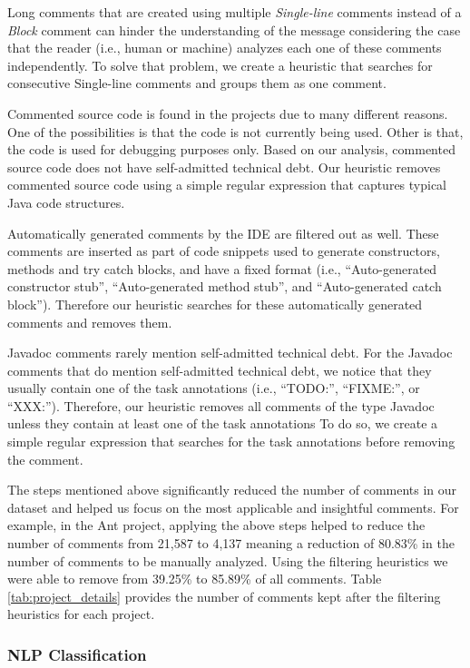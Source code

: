 Long comments that are created using multiple \emph{Single-line} comments instead of a \emph{Block} comment can hinder the understanding of the message considering the case that the reader (i.e., human or machine) analyzes each one of these comments independently. To solve that problem, we create a heuristic that searches for consecutive Single-line comments and groups them as one comment.
 
Commented source code is found in the projects due to many different reasons. One of the possibilities is that the code is not currently being used. Other is that, the code is used for debugging purposes only. Based on our analysis, commented source code does not have self-admitted technical debt. Our heuristic removes commented source code using a simple regular expression that captures typical Java code structures.

Automatically generated comments by the IDE are filtered out as well. These comments are inserted as part of code snippets used to generate constructors, methods and try catch blocks, and have a fixed format (i.e., ``Auto-generated constructor stub'', ``Auto-generated method stub'', and ``Auto-generated catch block''). Therefore our heuristic searches for these automatically generated comments and removes them. 

Javadoc comments rarely mention self-admitted technical debt. For the Javadoc comments that do mention self-admitted technical debt, we notice that they usually contain one of the task annotations (i.e., ``TODO:'', ``FIXME:'', or ``XXX:''). Therefore, our heuristic removes all comments of the type Javadoc unless they contain at least one of the task annotations  To do so, we create a simple regular expression that searches for the task annotations before removing the comment.  

The steps mentioned above significantly reduced the number of comments in our dataset and helped us focus on the most applicable and insightful comments. For example, in the Ant project, applying the above steps helped to reduce the number of comments from 21,587 to 4,137 meaning a reduction of 80.83\% in the number of comments to be manually analyzed. Using the filtering heuristics we were able to remove from 39.25\% to 85.89\% of all comments. Table \ref{tab:project_details} provides the number of comments kept after the filtering heuristics for each project.

\subsubsection*{NLP Classification}
\label{subsub:nlp_classification}

